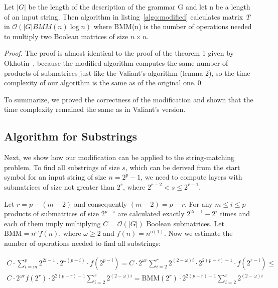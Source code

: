 \begin{theorem}
Let $|G|$ be the length of the description of the grammar G and let n be a length of an input string. Then algorithm in listing~\ref{algo:modified} calculates matrix \textit{T} in $\mathcal{O}(|G|BMM(n)\log{n})$ where BMM(n) is the number of operations needed to multiply two Boolean matrices of size $n \times n$.
\end{theorem}

\begin{proof}
The proof is almost identical to the proof of the theorem 1 given by Okhotin~\cite{Okhotin:2014:PMM:2565359.2565379}, because the modified algorithm computes the same number of products of submatrices just like the Valiant's algorithm (lemma 2), so the time complexity of our algorithm is the same as of the original one.\qed
\end{proof}

To summarize, we proved the correctness of the modification and shown that the time complexity remained the same as in Valiant's version.


\subsection{Algorithm for Substrings}

Next, we show how our modification can be applied to the string-matching problem.
To find all substrings of size $s$, which can be derived from the start symbol for an input string of size $n = 2^p - 1$, we need to compute layers with submatrices of size not greater than $2^{r}$, where $2^{r - 2} < s \le 2^{r - 1}$.

Let $r = p - (m - 2)$ and consequently $(m - 2) = p - r$.
For any  $m \le i \le p$ products of submatrices of size $2^{p - i}$ are calculated exactly $2^{2i - 1} - 2^{i}$ times and each of them imply multiplying $C = \mathcal{O}(|G|)$ Boolean submatrices. Let $\mathrm{BMM} = n^\omega f(n)$, where $\omega \geq 2$ and $f(n) = n^{o(1)}$.
Now we estimate the number of operations needed to find all substrings:

\begin{equation*}
\begin{array}{c}
C \cdot \sum\limits_{i=m}^p 2^{2i - 1} \cdot 2^{\omega(p - i)} \cdot f(2^{p - i}) =
C \cdot 2^{\omega r}\sum\limits_{i=2}^{r} 2^{(2 - \omega)i} \cdot 2^{2(p - r) - 1} \cdot f(2^{r - i}) \le \\
C \cdot 2^{\omega r} f(2^{r}) \cdot 2^{2(p - r) - 1} \sum\limits_{i=2}^{r} 2^{(2 - \omega)i} =
\mathrm{BMM}(2^{r}) \cdot 2^{2(p - r) - 1} \sum\limits_{i=2}^{r} 2^{(2 - \omega)i}
\end{array}
\end{equation*}

